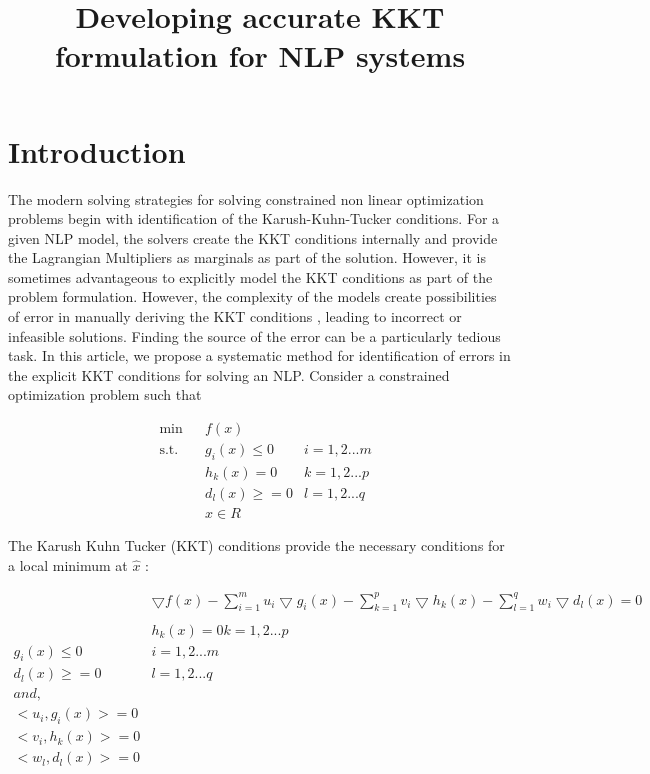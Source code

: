 \documentclass{article}
\title{Developing accurate KKT formulation for NLP systems}
\begin{document}
\section{Introduction}
The modern solving strategies for solving constrained non linear optimization problems begin with identification of the Karush-Kuhn-Tucker conditions. For a given NLP model, the solvers create the KKT conditions internally and provide the Lagrangian Multipliers as marginals as part of the solution. However, it is sometimes advantageous to explicitly model the KKT conditions as part of the problem formulation. However, the complexity of the models create possibilities of error in manually deriving the KKT conditions , leading to incorrect or infeasible solutions. Finding the source of the error can be a particularly tedious task.
In this article, we propose a systematic method for identification of errors in the explicit KKT conditions for solving an NLP. Consider a constrained optimization problem such that 

\begin{equation}
\begin{aligned}
&	\min
& & f(x) \\
& \text{s.t.} & & 	 g_{i}(x) \leqslant 0	&	i = 1,2...m \\
& & &			h_{k}(x) = 0	 &	k = 1,2...p \\
& & &			d_{l}(x) \geqslant =0		&	l = 1,2...q \\
& & &			x \in \!R
\end{aligned}
\end{equation}



The Karush Kuhn Tucker (KKT) conditions provide the necessary conditions for a local minimum at $\hat{x}$ :

\begin{equation}
\begin{aligned}
& \bigtriangledown{f(x)} - \sum_{i=1}^{m} u_{i} \bigtriangledown{g_{i}(x)}
			- \sum_{k=1}^{p} v_{i} \bigtriangledown{h_{k}(x)} - \sum_{l=1}^{q} w_{i} \bigtriangledown{d_{l}(x)} = 0  \\
\\
& h_{k}(x) = 0   k = 1,2...p  \\
g_{i}(x) \leqslant 0&	 i = 1,2...m \\  d_{l}(x) \geqslant =0	&	l = 1,2...q
\\
and,\\
<u_{i},g_{i}(x)> = 0 \\ <v_{i},h_{k}(x)> =0 \\  <w_{l},d_{l}(x)> =0
\end{aligned}
\end{equation}
\end{document}
